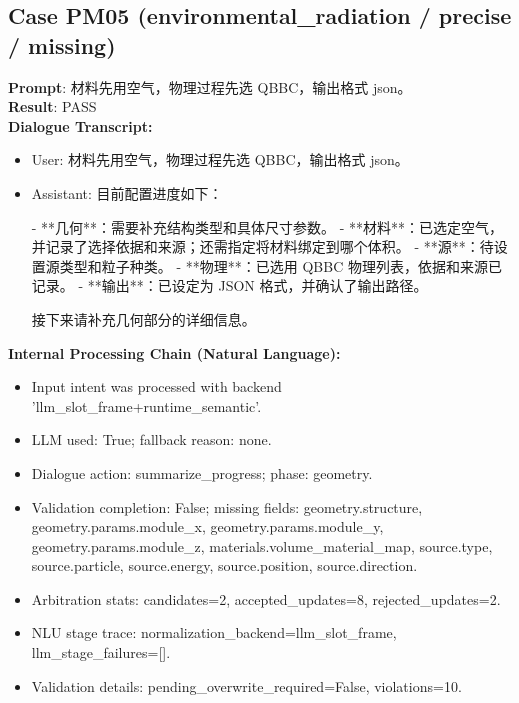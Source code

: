 \documentclass[11pt]{ctexart}
\begin{document}
\subsection{Case PM05 (environmental\_radiation / precise / missing)}
\textbf{Prompt}: 材料先用空气，物理过程先选 QBBC，输出格式 json。\\
\textbf{Result}: PASS\\
\textbf{Dialogue Transcript:}
\begin{itemize}
\item User: 材料先用空气，物理过程先选 QBBC，输出格式 json。
\item Assistant: 目前配置进度如下：

- **几何**：需要补充结构类型和具体尺寸参数。
- **材料**：已选定空气，并记录了选择依据和来源；还需指定将材料绑定到哪个体积。
- **源**：待设置源类型和粒子种类。
- **物理**：已选用 QBBC 物理列表，依据和来源已记录。
- **输出**：已设定为 JSON 格式，并确认了输出路径。

接下来请补充几何部分的详细信息。
\end{itemize}
\textbf{Internal Processing Chain (Natural Language):}
\begin{itemize}
\item Input intent was processed with backend 'llm\_slot\_frame+runtime\_semantic'.
\item LLM used: True; fallback reason: none.
\item Dialogue action: summarize\_progress; phase: geometry.
\item Validation completion: False; missing fields: geometry.structure, geometry.params.module\_x, geometry.params.module\_y, geometry.params.module\_z, materials.volume\_material\_map, source.type, source.particle, source.energy, source.position, source.direction.
\item Arbitration stats: candidates=2, accepted\_updates=8, rejected\_updates=2.
\item NLU stage trace: normalization\_backend=llm\_slot\_frame, llm\_stage\_failures=[].
\item Validation details: pending\_overwrite\_required=False, violations=10.
\end{itemize}
\end{document}
